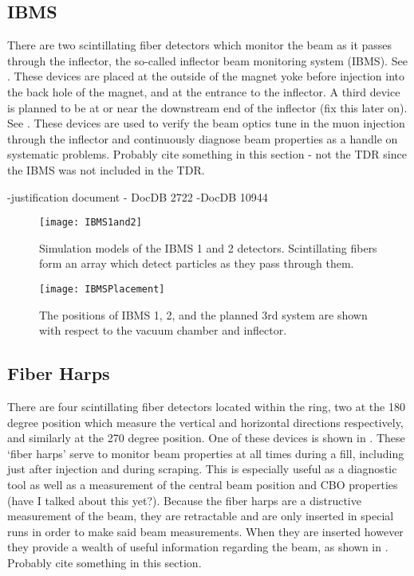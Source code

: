 \subsection{IBMS}
\label{sec:IBMS}

There are two scintillating fiber detectors which monitor the beam as it passes through the inflector, the so-called inflector beam monitoring system (IBMS). See . These devices are placed at the outside of the magnet yoke before injection into the back hole of the magnet, and at the entrance to the inflector. A third device is planned to be at or near the downstream end of the inflector (fix this later on). See . These devices are used to verify the beam optics tune in the muon injection through the inflector and continuously diagnose beam properties as a handle on systematic problems. Probably cite something in this section - not the TDR since the IBMS was not included in the TDR.

-justification document - DocDB 2722
-DocDB 10944


\begin{figure}[]
    \centering
    \texttt{[image: IBMS1and2]}
    \caption[IBMS Models]{Simulation models of the IBMS 1 and 2 detectors. Scintillating fibers form an array which detect particles as they pass through them.}   
    \label{fig:IBMS1and2}
\end{figure}

\begin{figure}[]
    \centering
    \texttt{[image: IBMSPlacement]}
    \caption[IBMS Positions]{The positions of IBMS 1, 2, and the planned 3rd system are shown with respect to the vacuum chamber and inflector.}   
    \label{fig:IBMSPlacement}
\end{figure}


\subsection{Fiber Harps}
\label{sec:FiberHarps}

There are four scintillating fiber detectors located within the ring, two at the 180 degree position which measure the vertical and horizontal directions respectively, and similarly at the 270 degree position. One of these devices is shown in . These `fiber harps' serve to monitor beam properties at all times during a fill, including just after injection and during scraping. This is especially useful as a diagnostic tool as well as a measurement of the central beam position and CBO properties (have I talked about this yet?). Because the fiber harps are a distructive measurement of the beam, they are retractable and are only inserted in special runs in order to make said beam measurements. When they are inserted however they provide a wealth of useful information regarding the beam, as shown in . Probably cite something in this section.

